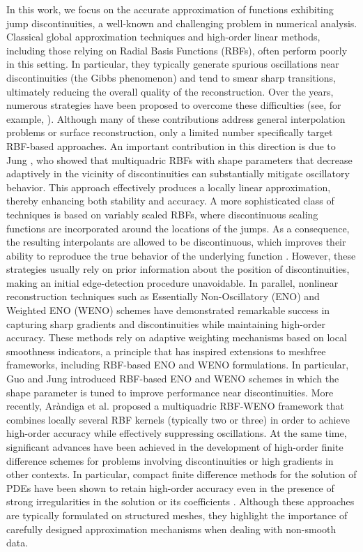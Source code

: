 \documentclass[preprint]{elsarticle}       %
\begin{document}
In this work, we focus on the accurate approximation of functions exhibiting jump discontinuities, a well-known and challenging problem in numerical analysis. Classical global approximation techniques and high-order linear methods, including those relying on Radial Basis Functions (RBFs), often perform poorly in this setting. In particular, they typically generate spurious oscillations near discontinuities (the Gibbs phenomenon) and tend to smear sharp transitions, ultimately reducing the overall quality of the reconstruction. Over the years, numerous strategies have been proposed to overcome these difficulties (see, for example, \cite{Arandiga2005,Bozzini2013,Bozzini2014,Crampton2005,Gout2008,Lenarduzzi2017}). Although many of these contributions address general interpolation problems or surface reconstruction, only a limited number specifically target RBF-based approaches. An important contribution in this direction is due to Jung \cite{Jung2007}, who showed that multiquadric RBFs with shape parameters that decrease adaptively in the vicinity of discontinuities can substantially mitigate oscillatory behavior. This approach effectively produces a locally linear approximation, thereby enhancing both stability and accuracy. A more sophisticated class of techniques is based on variably scaled RBFs, where discontinuous scaling functions are incorporated around the locations of the jumps. As a consequence, the resulting interpolants are allowed to be discontinuous, which improves their ability to reproduce the true behavior of the underlying function \cite{DeMarchi2019,Romani2018,Erb2019}. However, these strategies usually rely on prior information about the position of discontinuities, making an initial edge-detection procedure unavoidable. 
In parallel, nonlinear reconstruction techniques such as Essentially Non-Oscillatory (ENO) and Weighted ENO (WENO) schemes \cite{Liu1994,JiangShu1996} have demonstrated remarkable success in capturing sharp gradients and discontinuities while maintaining high-order accuracy. These methods rely on adaptive weighting mechanisms based on local smoothness indicators, a principle that has inspired extensions to meshfree frameworks, including RBF-based ENO and WENO formulations. In particular, Guo and Jung \cite{Guo2017a,Guo2017b} introduced RBF-based ENO and WENO schemes in which the shape parameter is tuned to improve performance near discontinuities. More recently, Ar\`andiga et al. \cite{Arandiga2020} proposed a multiquadric RBF-WENO framework that combines locally several RBF kernels (typically two or three) in order to achieve high-order accuracy while effectively suppressing oscillations. At the same time, significant advances have been achieved in the development of high-order finite difference schemes for problems involving discontinuities or high gradients in other contexts. In particular, compact finite difference methods for the solution of PDEs have been shown to retain high-order accuracy even in the presence of strong irregularities in the solution or its coefficients \cite{LiIto2006, Feng2021,Feng2022}. Although these approaches are typically formulated on structured meshes, they highlight the importance of carefully designed approximation mechanisms when dealing with non-smooth data.
\end{document}
